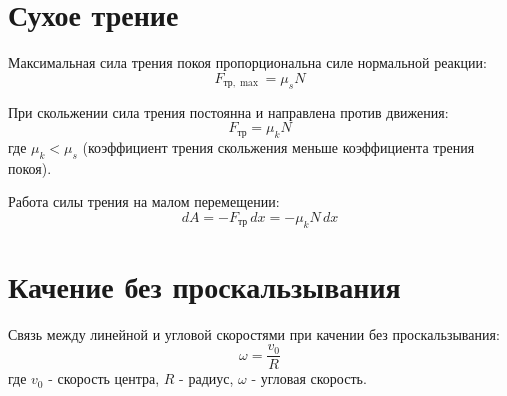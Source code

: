\documentclass{article}
\begin{document}
\section*{Сухое трение}

Максимальная сила трения покоя пропорциональна силе нормальной реакции:
\[
F_{\mathrm{тр},\max} = \mu_s N
\]

При скольжении сила трения постоянна и направлена против движения:
\[
F_{\mathrm{тр}} = \mu_k N
\]
где $\mu_k < \mu_s$ (коэффициент трения скольжения меньше коэффициента трения покоя).

Работа силы трения на малом перемещении:
\[
dA = -F_{\mathrm{тр}}\,dx = -\mu_kN\,dx
\]

\section*{Качение без проскальзывания}

Связь между линейной и угловой скоростями при качении без проскальзывания:
\[
\omega = \frac{v_0}{R}
\]
где $v_0$ - скорость центра, $R$ - радиус, $\omega$ - угловая скорость.
\end{document}
